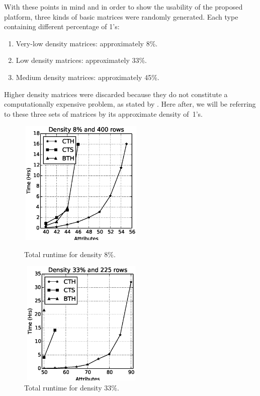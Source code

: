 \documentclass[authoryear,11pt]{elsarticle}
\begin{document}
	With these points in mind and in order to show the usability of the proposed platform, 
	three kinds of basic matrices were randomly generated. Each type containing different percentage of 1's: 
	\begin{enumerate}
		\item Very-low density matrices: approximately 8\%.
		\item Low density matrices: approximately 33\%.
		\item Medium density matrices: approximately 45\%.
	\end{enumerate}
	
	Higher density matrices were discarded because they do not constitute a computationally expensive problem, 
	as stated by \cite{Rojas12}. Here after, we will be referring to these three sets of matrices by its 
	approximate density of~1's.
	
	\begin{figure}[htb]
	\centering
	\begin{minipage}{.5\textwidth}
	  \centering
	   \includegraphics[width=6cm , height=6cm]{low_density.eps}
	  \caption{Total runtime for density 8\%.}
	  \label{fig:result1}
	\end{minipage}%
	\begin{minipage}{.5\textwidth}
	  \centering
	   \includegraphics[width=6cm , height=6cm]{med_density.eps}
	  \caption{Total runtime for density 33\%.}
	  \label{fig:result2}
	\end{minipage}
	\end{figure}
	
\end{document}
